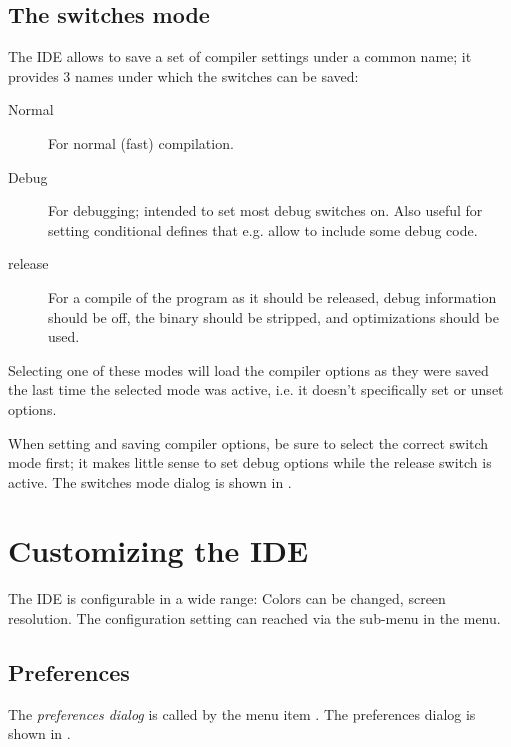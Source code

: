 \subsection{The switches mode}
\label{se:compilermode}
The IDE allows to save a set of compiler settings under a common name; it
provides 3 names under which the switches can be saved:
\begin{description}
\item[Normal] For normal (fast) compilation.
\item[Debug] For debugging; intended to set most debug switches on. Also
useful for setting conditional defines that e.g. allow to include some
debug code.
\item[release] For a compile of the program as it should be released, debug
information should be off, the binary should be stripped, and optimizations
should be used.
\end{description}
Selecting one of these modes will load the compiler options as they were
saved the last time the selected mode was active, i.e. it doesn't
specifically set or unset options. 

When setting and saving compiler options, be sure to select the correct
switch mode first; it makes little sense to set debug options while the
release switch is active.
The switches mode dialog is shown in .


\section{Customizing the IDE}
The IDE is configurable in a wide range: Colors can be changed, screen
resolution. The configuration setting can reached via the
sub-menu  in the  menu.
%
%
\subsection{Preferences}
The {\em preferences dialog} is called by the menu item
.
The preferences dialog is shown in .



